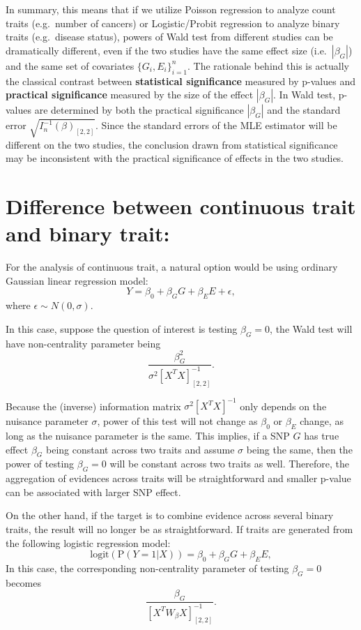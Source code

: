 \documentclass[
]{article}
\begin{document}
In summary, this means that if we utilize Poisson regression to analyze
count traits (e.g.~number of cancers) or Logistic/Probit regression to
analyze binary traits (e.g.~disease status), powers of Wald test from
different studies can be dramatically different, even if the two studies
have the same effect size (i.e.~\(|\beta_G|\)) and the same set of
covariates \(\{G_{i},E_{i}\}_{i=1}^n\). The rationale behind this is
actually the classical contrast between
\textbf{statistical significance} measured by p-values and
\textbf{practical significance} measured by the size of the effect
\(|\beta_G|\). In Wald test, p-values are determined by both the
practical significance \(|\beta_G|\) and the standard error
\(\sqrt{I_n^{-1}(\beta)_{[2,2]}}\). Since the standard errors of the MLE
estimator will be different on the two studies, the conclusion drawn
from statistical significance may be inconsistent with the practical
significance of effects in the two studies.

\hypertarget{difference-between-continuous-trait-and-binary-trait}{%
\section{Difference between continuous trait and binary
trait:}\label{difference-between-continuous-trait-and-binary-trait}}

For the analysis of continuous trait, a natural option would be using
ordinary Gaussian linear regression model:
\[Y = \beta_0 + \beta_G G + \beta_E E+\epsilon,\] where
\(\epsilon \sim N(0,\sigma)\).

In this case, suppose the question of interest is testing \(\beta_G=0\),
the Wald test will have non-centrality parameter being
\[\frac{\beta_G^2}{\sigma^2[X^TX]^{-1}_{[2,2]}}.\]

Because the (inverse) information matrix \(\sigma^2[X^TX]^{-1}\) only
depends on the nuisance parameter \(\sigma\), power of this test will
not change as \(\beta_0\) or \(\beta_E\) change, as long as the nuisance
parameter is the same. This implies, if a SNP \(G\) has true effect
\(\beta_G\) being constant across two traits and assume \(\sigma\) being
the same, then the power of testing \(\beta_G = 0\) will be constant
across two traits as well. Therefore, the aggregation of evidences
across traits will be straightforward and smaller p-value can be
associated with larger SNP effect.

On the other hand, if the target is to combine evidence across several
binary traits, the result will no longer be as straightforward. If
traits are generated from the following logistic regression model:
\[\text{logit}(\text{P}(Y=1|X)) = \beta_0 + \beta_G G + \beta_E E,\] In
this case, the corresponding non-centrality parameter of testing
\(\beta_G=0\) becomes \[\frac{\beta_G}{[X^TW_\beta X]^{-1}_{[2,2]}}.\]
\end{document}
